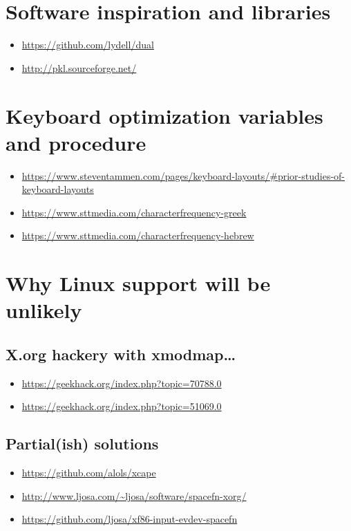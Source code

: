 \documentclass[11pt]{article}
\begin{document}
\section{Software inspiration and libraries}
\label{sec:orgca781b5}

\begin{itemize}
\item \url{https://github.com/lydell/dual}
\item \url{http://pkl.sourceforge.net/}
\end{itemize}

\section{Keyboard optimization variables and procedure}
\label{sec:orgde89b60}

\begin{itemize}
\item \url{https://www.steventammen.com/pages/keyboard-layouts/\#prior-studies-of-keyboard-layouts}
\item \url{https://www.sttmedia.com/characterfrequency-greek}
\item \url{https://www.sttmedia.com/characterfrequency-hebrew}
\end{itemize}

\section{Why Linux support will be unlikely}
\label{sec:org9d07364}

\subsection{X.org hackery with xmodmap\ldots{}}
\label{sec:org239f17b}

\begin{itemize}
\item \url{https://geekhack.org/index.php?topic=70788.0}
\item \url{https://geekhack.org/index.php?topic=51069.0}
\end{itemize}

\subsection{Partial(ish) solutions}
\label{sec:org94697aa}

\begin{itemize}
\item \url{https://github.com/alols/xcape}
\item \url{http://www.ljosa.com/\~ljosa/software/spacefn-xorg/}
\item \url{https://github.com/ljosa/xf86-input-evdev-spacefn}
\end{itemize}
\end{document}
